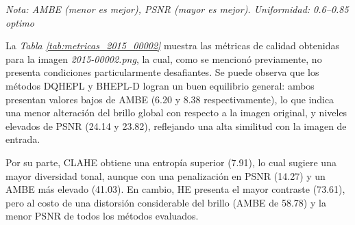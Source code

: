\documentclass[sigchi]{acmart}
\begin{document}
\begin{table}[H]
	\centering
	\caption{Métricas de calidad para la imagen 2015\_00002.png}
	\label{tab:metricas_2015_00002}

	\vspace{0.5em} %


	\vspace{0.5em} %
	\footnotesize%
	\textit{Nota: AMBE (menor es mejor), PSNR (mayor es mejor). Uniformidad: 0.6–0.85 optimo}
\end{table}

La \emph{Tabla \ref{tab:metricas_2015_00002}} muestra las métricas de calidad obtenidas para la imagen
\emph{2015-00002.png}, la cual, como se mencionó previamente, no presenta condiciones particularmente
desafiantes. Se puede observa que los métodos DQHEPL y BHEPL-D logran un buen
equilibrio general: ambos presentan valores bajos de AMBE (6.20 y 8.38 respectivamente), lo que
indica una menor alteración del brillo global con respecto a la imagen original, y niveles
elevados de PSNR (24.14 y 23.82), reflejando una alta similitud con la imagen de entrada.

Por su parte, CLAHE obtiene una entropía superior (7.91), lo cual sugiere una mayor diversidad
tonal, aunque con una penalización en PSNR (14.27) y un AMBE más elevado (41.03). En cambio, HE
presenta el mayor contraste (73.61), pero al costo de una distorsión considerable del brillo
(AMBE de 58.78) y la menor PSNR de todos los métodos evaluados.
\end{document}
